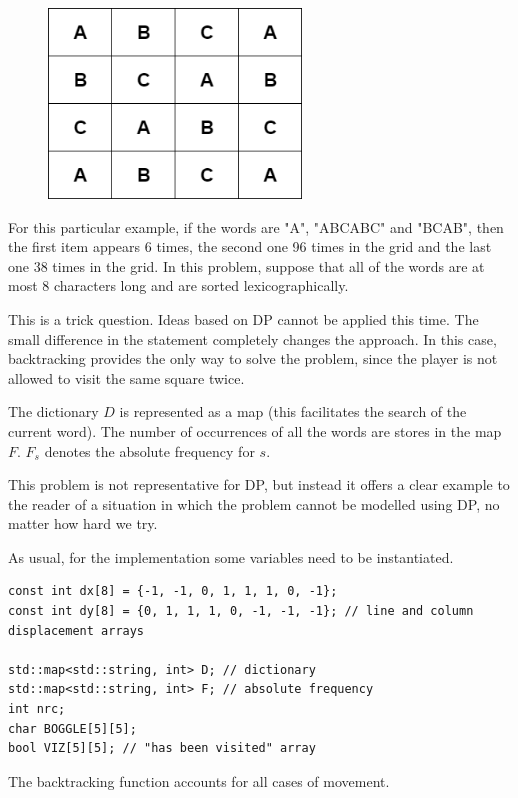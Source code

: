 \documentclass[letterpaper]{article}
\begin{document}
\begin{figure} [h!]
\centering
\includegraphics[width=0.60\textwidth]{pngOfDiagrams/dppaths6.png}
\end{figure}

For this particular example, if the words are "A", "ABCABC" and "BCAB", then the first item appears 6 times, the second one 96 times in the grid and the last one 38 times in the grid. In this problem, suppose that all of the words are at most 8 characters long and are sorted lexicographically.

This is a trick question. Ideas based on DP cannot be applied this time. The small difference in the statement completely changes the approach. In this case, backtracking provides the only way to solve the problem, since the player is not allowed to visit the same square twice.

The dictionary $D$ is represented as a map (this facilitates the search of the current word). The number of occurrences of all the words are stores in the map $F$. $F_s$ denotes the absolute frequency for $s$.

This problem is not representative for DP, but instead it offers a clear example to the reader of a situation in which the problem cannot be modelled using DP, no matter how hard we try.

As usual, for the implementation some variables need to be instantiated.

\begin{lstlisting}
const int dx[8] = {-1, -1, 0, 1, 1, 1, 0, -1};
const int dy[8] = {0, 1, 1, 1, 0, -1, -1, -1}; // line and column displacement arrays

std::map<std::string, int> D; // dictionary
std::map<std::string, int> F; // absolute frequency
int nrc;
char BOGGLE[5][5];
bool VIZ[5][5]; // "has been visited" array
\end{lstlisting}

The backtracking function accounts for all cases of movement.
\end{document}
